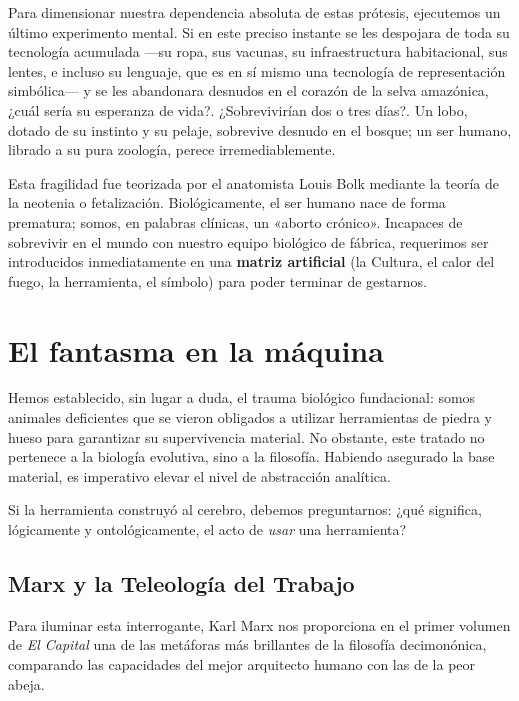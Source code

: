 Para dimensionar nuestra dependencia absoluta de estas prótesis, ejecutemos un último experimento mental. Si en este preciso instante se les despojara de toda su tecnología acumulada —su ropa, sus vacunas, su infraestructura habitacional, sus lentes, e incluso su lenguaje, que es en sí mismo una tecnología de representación simbólica— y se les abandonara desnudos en el corazón de la selva amazónica, ¿cuál sería su esperanza de vida?. ¿Sobrevivirían dos o tres días?. Un lobo, dotado de su instinto y su pelaje, sobrevive desnudo en el bosque; un ser humano, librado a su pura zoología, perece irremediablemente.

Esta fragilidad fue teorizada por el anatomista Louis Bolk mediante la teoría de la neotenia o fetalización. Biológicamente, el ser humano nace de forma prematura; somos, en palabras clínicas, un «aborto crónico». Incapaces de sobrevivir en el mundo con nuestro equipo biológico de fábrica, requerimos ser introducidos inmediatamente en una \textbf{matriz artificial} (la Cultura, el calor del fuego, la herramienta, el símbolo) para poder terminar de gestarnos.

\section{El fantasma en la máquina}

Hemos establecido, sin lugar a duda, el trauma biológico fundacional: somos animales deficientes que se vieron obligados a utilizar herramientas de piedra y hueso para garantizar su supervivencia material. No obstante, este tratado no pertenece a la biología evolutiva, sino a la filosofía. Habiendo asegurado la base material, es imperativo elevar el nivel de abstracción analítica. 

Si la herramienta construyó al cerebro, debemos preguntarnos: ¿qué significa, lógicamente y ontológicamente, el acto de \textit{usar} una herramienta?

\subsection{Marx y la Teleología del Trabajo}

Para iluminar esta interrogante, Karl Marx nos proporciona en el primer volumen de \textit{El Capital} una de las metáforas más brillantes de la filosofía decimonónica, comparando las capacidades del mejor arquitecto humano con las de la peor abeja. 

